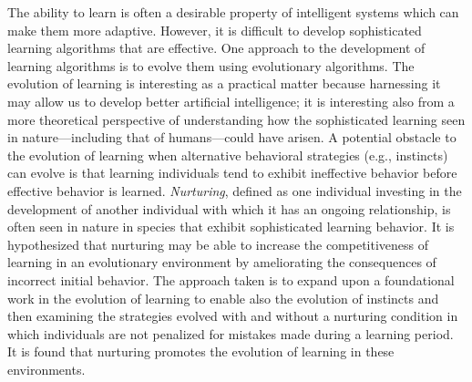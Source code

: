 The ability to learn is often a desirable property of intelligent systems which can make them more adaptive.
However, it is difficult to develop sophisticated learning algorithms that are effective.
One approach to the development of learning algorithms is to evolve them using evolutionary algorithms.
The evolution of learning is interesting as a practical matter because harnessing it may allow us to develop better artificial intelligence;
it is interesting also from a more theoretical perspective of understanding how the sophisticated learning seen in nature---including that of humans---could have arisen.
A potential obstacle to the evolution of learning when alternative behavioral strategies (e.g., instincts) can evolve is that learning individuals tend to exhibit ineffective behavior before effective behavior is learned.
\emph{Nurturing}, defined as one individual investing in the development of another individual with which it has an ongoing relationship, is often seen in nature in species that exhibit sophisticated learning behavior.
It is hypothesized that nurturing may be able to increase the competitiveness of learning in an evolutionary environment by ameliorating the consequences of incorrect initial behavior.
The approach taken is to expand upon a foundational work in the evolution of learning to enable also the evolution of instincts and then examining the strategies evolved with and without a nurturing condition in which individuals are not penalized for mistakes made during a learning period.
It is found that nurturing promotes the evolution of learning in these environments.